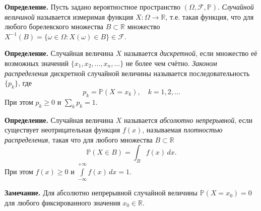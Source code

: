 \textbf{Определение.} Пусть задано вероятностное пространство $(\Omega, \mathcal{F}, \mathbb{P})$. \textit{Случайной величиной} называется измеримая функция $X: \Omega \to \mathbb{R}$, т.е. такая функция, что для любого борелевского множества $B \subset \mathbb{R}$ множество $X^{-1}(B) = \{\omega \in \Omega : X(\omega) \in B\} \in \mathcal{F}$.

\textbf{Определение.} Случайная величина $X$ называется \textit{дискретной}, если множество её возможных значений $\{x_1, x_2, \ldots, x_n, \ldots\}$ не более чем счётно. \textit{Законом распределения} дискретной случайной величины называется последовательность $\{p_k\}$, где
\[
p_k = \mathbb{P}(X = x_k), \quad k = 1, 2, \ldots
\]
При этом $p_k \geq 0$ и $\sum\limits_{k} p_k = 1$.

\textbf{Определение.} Случайная величина $X$ называется \textit{абсолютно непрерывной}, если существует неотрицательная функция $f(x)$, называемая \textit{плотностью распределения}, такая что для любого множества $B \subset \mathbb{R}$
\[
\mathbb{P}(X \in B) = \int_B f(x) \, dx.
\]
При этом $f(x) \geq 0$ и $\int\limits_{-\infty}^{+\infty} f(x) \, dx = 1$.

\textbf{Замечание.} Для абсолютно непрерывной случайной величины $\mathbb{P}(X = x_0) = 0$ для любого фиксированного значения $x_0 \in \mathbb{R}$.
